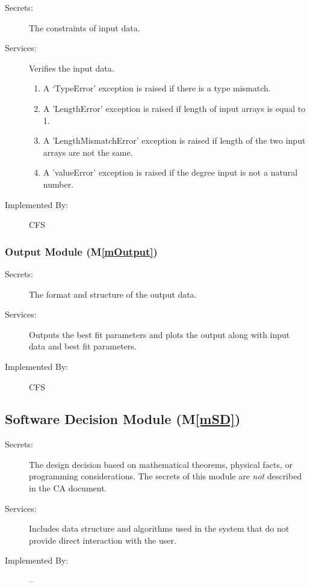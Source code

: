 \documentclass[12pt, titlepage]{article}
\newcommand{\mref}[1]{M\ref{#1}}
\newcommand{\famname}{CFS} %
\begin{document}
\begin{description}
	\item[Secrets:]The constraints of input data.
	\item[Services:]Verifies the input data. 
		\begin{enumerate}
			\item A `TypeError' exception is raised if there is a type mismatch.
			\item A 'LengthError' exception is raised if length of input arrays 
			is equal to 1.
			\item A 'LengthMismatchError' exception is raised if length of the 
			two input arrays are not the same.
			\item A 'valueError' exception is raised if the degree input is not 
			a natural number.
		\end{enumerate} 
	\item[Implemented By:] \famname{}
\end{description}



\subsubsection{Output Module (\mref{mOutput})}

\begin{description}
	\item[Secrets:] The format and structure of the output data.
	\item[Services:] Outputs the best fit parameters and plots the output
          along with input data and best fit parameters.
	\item[Implemented By:] \famname{}
\end{description} 



\subsection{Software Decision Module (\mref{mSD})}

\begin{description}
\item[Secrets:] The design decision based on mathematical theorems, physical
  facts, or programming considerations. The secrets of this module are
  \emph{not} described in the CA document.
\item[Services:] Includes data structure and algorithms used in the system that
  do not provide direct interaction with the user. 
\item[Implemented By:] --
\end{description}
\end{document}
